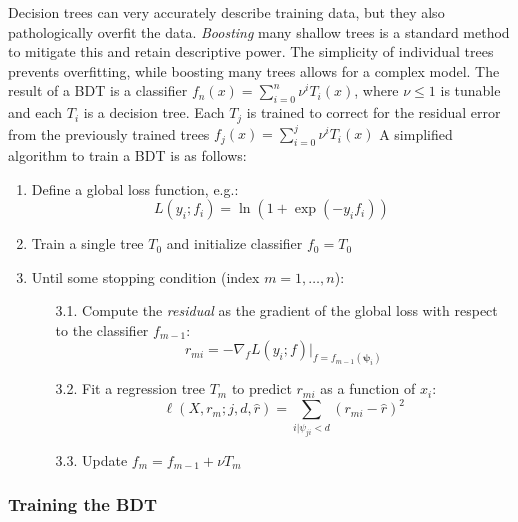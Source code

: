 Decision trees can very accurately describe training data, but they also pathologically overfit the data.
\emph{Boosting} many shallow trees is a standard method to mitigate this and retain descriptive power.
The simplicity of individual trees prevents overfitting, while boosting many trees allows for a complex model.
The result of a BDT is a classifier $f_n(x) = \sum_{i=0}^n \nu^i T_i(x)$, where $\nu\leq 1$ is tunable and each $T_i$ is a decision tree. 
Each $T_j$ is trained to correct for the residual error from the previously trained trees $f_j(x) =  \sum_{i=0}^j \nu^i T_i(x)$
A simplified algorithm to train a BDT is as follows:
\begin{enumerate}
    \item Define a global loss function, e.g.:
        \begin{equation} L(y_i; f_i) = \ln\left(1 + \exp(-y_if_i)\right)\end{equation}
    \item Train a single tree $T_0$ and initialize classifier $f_0 = T_0$
    \item Until some stopping condition (index $m=1,\dots,n$):
    \begin{enumerate}
      \item[3.1.] Compute the \emph{residual} as the gradient of the global loss with respect to the classifier $f_{m-1}$:
        \begin{equation}r_{mi} = -\nabla_f L(y_i; f) |_{f=f_{m-1}(\bm\psi_i)}\end{equation}
      \item[3.2.] Fit a regression tree $T_m$ to predict $r_{mi}$ as a function of $x_i$:
        \begin{equation}\ell(X,r_m;j,d,\hat{r}) = \sum_{i | \psi_{ji} < d} (r_{mi} - \hat r)^2\end{equation}
      \item[3.3.] Update $f_m = f_{m-1} + \nu T_m$
    \end{enumerate}
\end{enumerate}

\subsubsection{Training the BDT}


